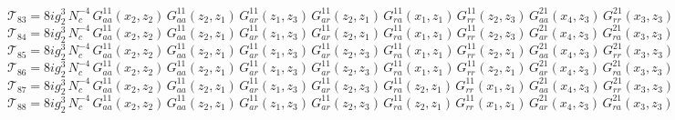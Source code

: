 \documentclass{article}
\begin{document}
\begin{equation*}
\mathcal{T}_{83} = 8 i g_{2}^{3}\,N_c^{-4}\,G^{11}_{aa}\left(x_2,z_{2}\right) \, G^{11}_{aa}\left(z_{2},z_{1}\right) \, G^{11}_{ar}\left(z_{1},z_{3}\right) \, G^{11}_{ar}\left(z_{2},z_{1}\right) \, G^{11}_{ra}\left(x_1,z_{1}\right) \, G^{11}_{rr}\left(z_{2},z_{3}\right) \, G^{21}_{aa}\left(x_4,z_{3}\right) \, G^{21}_{rr}\left(x_3,z_{3}\right)
\end{equation*}
\begin{equation*}
\mathcal{T}_{84} = 8 i g_{2}^{3}\,N_c^{-4}\,G^{11}_{aa}\left(x_2,z_{2}\right) \, G^{11}_{aa}\left(z_{2},z_{1}\right) \, G^{11}_{ar}\left(z_{1},z_{3}\right) \, G^{11}_{ar}\left(z_{2},z_{1}\right) \, G^{11}_{ra}\left(x_1,z_{1}\right) \, G^{11}_{rr}\left(z_{2},z_{3}\right) \, G^{21}_{ar}\left(x_4,z_{3}\right) \, G^{21}_{ra}\left(x_3,z_{3}\right)
\end{equation*}
\begin{equation*}
\mathcal{T}_{85} = 8 i g_{2}^{3}\,N_c^{-4}\,G^{11}_{aa}\left(x_2,z_{2}\right) \, G^{11}_{aa}\left(z_{2},z_{1}\right) \, G^{11}_{ar}\left(z_{1},z_{3}\right) \, G^{11}_{ar}\left(z_{2},z_{3}\right) \, G^{11}_{ra}\left(x_1,z_{1}\right) \, G^{11}_{rr}\left(z_{2},z_{1}\right) \, G^{21}_{aa}\left(x_4,z_{3}\right) \, G^{21}_{rr}\left(x_3,z_{3}\right)
\end{equation*}
\begin{equation*}
\mathcal{T}_{86} = 8 i g_{2}^{3}\,N_c^{-4}\,G^{11}_{aa}\left(x_2,z_{2}\right) \, G^{11}_{aa}\left(z_{2},z_{1}\right) \, G^{11}_{ar}\left(z_{1},z_{3}\right) \, G^{11}_{ar}\left(z_{2},z_{3}\right) \, G^{11}_{ra}\left(x_1,z_{1}\right) \, G^{11}_{rr}\left(z_{2},z_{1}\right) \, G^{21}_{ar}\left(x_4,z_{3}\right) \, G^{21}_{ra}\left(x_3,z_{3}\right)
\end{equation*}
\begin{equation*}
\mathcal{T}_{87} = 8 i g_{2}^{3}\,N_c^{-4}\,G^{11}_{aa}\left(x_2,z_{2}\right) \, G^{11}_{aa}\left(z_{2},z_{1}\right) \, G^{11}_{ar}\left(z_{1},z_{3}\right) \, G^{11}_{ar}\left(z_{2},z_{3}\right) \, G^{11}_{ra}\left(z_{2},z_{1}\right) \, G^{11}_{rr}\left(x_1,z_{1}\right) \, G^{21}_{aa}\left(x_4,z_{3}\right) \, G^{21}_{rr}\left(x_3,z_{3}\right)
\end{equation*}
\begin{equation*}
\mathcal{T}_{88} = 8 i g_{2}^{3}\,N_c^{-4}\,G^{11}_{aa}\left(x_2,z_{2}\right) \, G^{11}_{aa}\left(z_{2},z_{1}\right) \, G^{11}_{ar}\left(z_{1},z_{3}\right) \, G^{11}_{ar}\left(z_{2},z_{3}\right) \, G^{11}_{ra}\left(z_{2},z_{1}\right) \, G^{11}_{rr}\left(x_1,z_{1}\right) \, G^{21}_{ar}\left(x_4,z_{3}\right) \, G^{21}_{ra}\left(x_3,z_{3}\right)
\end{equation*}
\end{document}
